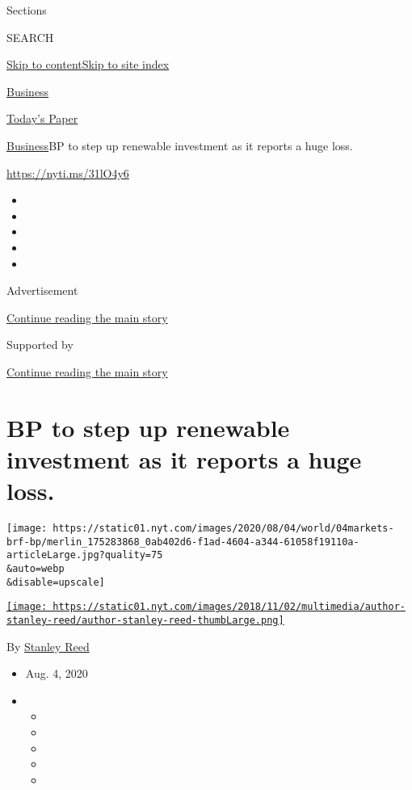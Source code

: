 Sections

SEARCH

\protect\hyperlink{site-content}{Skip to
content}\protect\hyperlink{site-index}{Skip to site index}

\href{https://www.nytimes.com/section/business}{Business}

\href{https://myaccount.nytimes.com/auth/login?response_type=cookie\&client_id=vi}{}

\href{https://www.nytimes.com/section/todayspaper}{Today's Paper}

\href{/section/business}{Business}\textbar{}BP to step up renewable
investment as it reports a huge loss.

\url{https://nyti.ms/31lO4y6}

\begin{itemize}
\item
\item
\item
\item
\item
\end{itemize}

Advertisement

\protect\hyperlink{after-top}{Continue reading the main story}

Supported by

\protect\hyperlink{after-sponsor}{Continue reading the main story}

\hypertarget{bp-to-step-up-renewable-investment-as-it-reports-a-huge-loss}{%
\section{BP to step up renewable investment as it reports a huge
loss.}\label{bp-to-step-up-renewable-investment-as-it-reports-a-huge-loss}}

\texttt{[image: https://static01.nyt.com/images/2020/08/04/world/04markets-brf-bp/merlin\_175283868\_0ab402d6-f1ad-4604-a344-61058f19110a-articleLarge.jpg?quality=75\\\&auto=webp\\\&disable=upscale]}

\href{https://www.nytimes.com/by/stanley-reed}{\texttt{[image: https://static01.nyt.com/images/2018/11/02/multimedia/author-stanley-reed/author-stanley-reed-thumbLarge.png]}}

By \href{https://www.nytimes.com/by/stanley-reed}{Stanley Reed}

\begin{itemize}
\item
  Aug. 4, 2020
\item
  \begin{itemize}
  \item
  \item
  \item
  \item
  \item
  \end{itemize}
\end{itemize}

